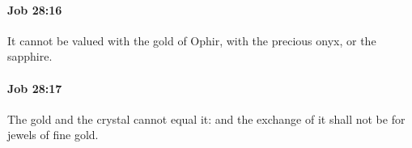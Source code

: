 		\paragraph{Job 28:16} %
			\label{JOB-28-16}

			It cannot be valued with the gold of Ophir, with the precious onyx, or the sapphire.


		\paragraph{Job 28:17} %
			\label{JOB-28-17}

			The gold and the crystal cannot equal it: and the exchange of it shall not be for jewels of fine gold.


